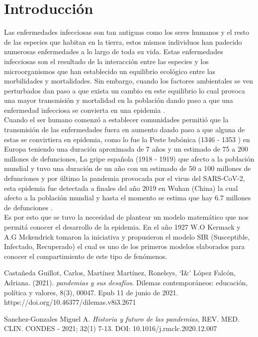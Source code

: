 \documentclass[a4paper,openany,12pt]{book}
\begin{document}
\chapter*{Introducción}

Las enfermedades infecciosas son tan antiguas como los seres humanos y el resto de las especies que habitan en la tierra, estos mismos individuos han padecido numerosas enfermedades a lo largo de toda su vida. Estas enfermedades infecciosas son el resultado de la interacción entre las especies y los microorganismos que han establecido un equilibrio ecológico entre las morbilidades y mortalidades. Sin embargo, cuando los factores ambientales se ven perturbados dan paso a que exista un cambio en este equilibrio lo cual provoca una mayor transmisión y mortalidad en la población dando paso a que una enfermedad infecciosa se convierta en una epidemia \cite{HyFP}.\\  %

Cuando el ser humano comenzó a establecer comunidades permitió que la transmisión de las enfermedades fuera en aumento dando paso a que alguna de estas se convirtiera en epidemia, como lo fue la Peste bubónica (1346 - 1353 ) en Europa  teniendo una duración aproximada de 7 años y un estimado de 75 a 200 millones de defunciones, La gripe española (1918 - 1919) que afecto a la población mundial y tuvo una duración de un año con un estimado de 50 a 100 millones de defunciones y por último la pandemia provocada por el virus del SARS-CoV-2, esta epidemia fue detectada a finales del año 2019 en Wuhan (China) la cual afecto a la población mundial y hasta el momento se estima que hay 6.7 millones de defunciones
\cite{GpySD}.\\

Es por esto que se tuvo la necesidad de plantear un modelo matemático que nos permitá conocer el desarrollo de la epidemia. En el año 1927 W.O Kermack y A.G Mckendrick tomaron la iniciativa y propusieron el modelo SIR (Susceptible, Infectado, Recuperado) el cual es uno de los primeros modelos elaborados para conocer el compartimiento de este tipo de fenómenos.\\

\begin{thebibliography}{3}

Castañeda Guillot, Carlos, Martínez Martínez, Ronelsys, `I\&' López Falcón, Adriana. (2021). \textit{pandemias y sus desafíos}. Dilemas contemporáneos: educación, política y valores, 8(3), 00047. Epub 11 de junio de 2021. https://doi.org/10.46377/dilemas.v8i3.2671


Sanchez-Gonzales Miguel A. \textit{Historia y futuro de las pandemias}, REV. MED. CLIN. CONDES - 2021; 32(1) 7-13. 
DOI: 10.1016/j.rmclc.2020.12.007


\end{thebibliography}
\end{document}
